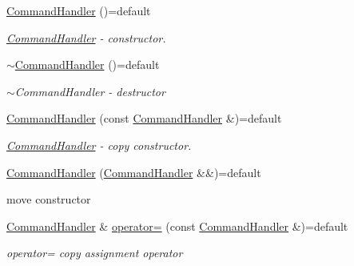 \begin{DoxyCompactItemize}
\item 
\hyperlink{classtwo__gis__test_1_1command__handler_1_1_command_handler_ae9dd6f4dd96935fee159c1d896ff28a2}{Command\+Handler} ()=default
\begin{DoxyCompactList}\small\item\em \hyperlink{classtwo__gis__test_1_1command__handler_1_1_command_handler}{Command\+Handler} -\/ constructor. \end{DoxyCompactList}\item 
\hyperlink{classtwo__gis__test_1_1command__handler_1_1_command_handler_a845742e513ce6278dfd625629aa83d61}{$\sim$\+Command\+Handler} ()=default
\begin{DoxyCompactList}\small\item\em $\sim$\+Command\+Handler -\/ destructor \end{DoxyCompactList}\item 
\hyperlink{classtwo__gis__test_1_1command__handler_1_1_command_handler_a7e9058925ed115c7ef068a7e07cc1602}{Command\+Handler} (const \hyperlink{classtwo__gis__test_1_1command__handler_1_1_command_handler}{Command\+Handler} \&)=default
\begin{DoxyCompactList}\small\item\em \hyperlink{classtwo__gis__test_1_1command__handler_1_1_command_handler}{Command\+Handler} -\/ copy constructor. \end{DoxyCompactList}\item 
\hyperlink{classtwo__gis__test_1_1command__handler_1_1_command_handler_ae58ae9fd0d34f1ad2ee56fd454efc07d}{Command\+Handler} (\hyperlink{classtwo__gis__test_1_1command__handler_1_1_command_handler}{Command\+Handler} \&\&)=default
\begin{DoxyCompactList}\small\item\em 
\begin{DoxyItemize}
\item move constructor 
\end{DoxyItemize}\end{DoxyCompactList}\item 
\hyperlink{classtwo__gis__test_1_1command__handler_1_1_command_handler}{Command\+Handler} \& \hyperlink{classtwo__gis__test_1_1command__handler_1_1_command_handler_af1f40cd93f9c9d73356579f0cead177e}{operator=} (const \hyperlink{classtwo__gis__test_1_1command__handler_1_1_command_handler}{Command\+Handler} \&)=default
\begin{DoxyCompactList}\small\item\em operator= copy assignment operator \end{DoxyCompactList}\item 

\end{DoxyCompactItemize}
